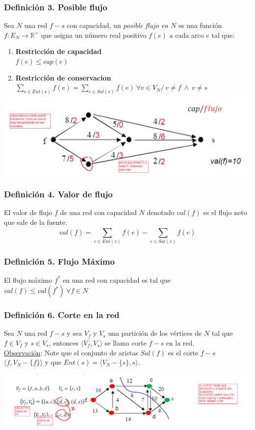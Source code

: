 \documentclass{article}
\newcommand{\lands}{\:\land\:}                          %
\newcommand{\tq}{/\,}                                   %
\newcommand{\reales}{\mathbb{R}}                        %
\newcommand{\bld}[1]{\textbf{#1}}
\newcommand{\sumatoria}[2]{\sum_{#1} ^{#2}}
\begin{document}
\subsubsection*{Definición 3. Posible flujo}
Sea $N$ una red $f-s$ con capacidad, un \emph{posible flujo en $N$} es una función 
$f: E_N \rightarrow \reales^+$ que asigna un número real positivo $f(e)$ a cada arco $e$ tal que:
\begin{enumerate}
    \item \bld{Restricción de capacidad} \\$f(e) \leq cap(e)$ 
    \item \bld{Restricción de conservacion} \\$\sumatoria{e \in Ent(v)}{} f(e) = \sumatoria{e \in Sal(v)}{} f(e) \: \forall v \in V_N \tq v \neq f \lands v \neq s$ 
\end{enumerate}
\begin{center}
    \includegraphics[width=.70\textwidth]{posibleFlujo.PNG}
\end{center}

\subsubsection*{Definición 4. Valor de flujo}
El valor de flujo $f$ de una red con capacidad $N$ denotado $val(f)$ es el flujo neto que sale de la fuente.
\begin{equation*}
    val(f) = \sumatoria{e \in Ent(v)}{} f(e) - \sumatoria{e \in Sal(v)}{} f(e)
\end{equation*}

\subsubsection*{Definición 5. Flujo Máximo}
El flujo máximo $f^*$ en una red con capacidad es tal que $val(f) \leq val(f^*) \: \forall f \in N$

\subsubsection*{Definición 6. Corte en la red}
Sea $N$ una red $f-s$ y sea $V_f$ y $V_s$ una partición de los vértices de $N$ tal que $f \in V_f$ y
$s \in V_s$, entonces $\langle V_f, V_s \rangle$ se llama corte $f-s$ en la red.
\\\underline{Observación}: Note que el conjunto de aristas $Sal(f)$ es el corte $f-s$ $\langle f, V_N - \{f\} \rangle$ 
y que $Ent(s) = \langle V_N - \{s\}, s \rangle$.
\begin{center}
    \includegraphics[width=.60\textwidth]{corteEnLaRed.PNG}
\end{center}
\end{document}
